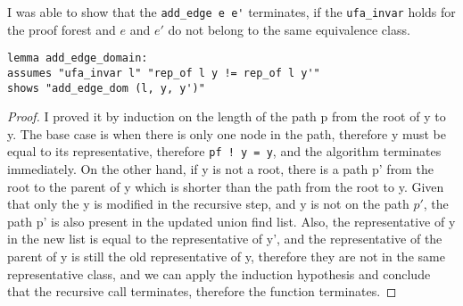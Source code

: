 I was able to show that the \lstinline{add_edge e e'} terminates, if the \lstinline{ufa_invar} holds for the proof forest and $e$ and $e'$ do not belong to the same equivalence class. 

\begin{lstlisting}
lemma add_edge_domain: 
assumes "ufa_invar l" "rep_of l y != rep_of l y'"
shows "add_edge_dom (l, y, y')"
\end{lstlisting}


\begin{proof}
I proved it by induction on the length of the path p from the root of y to y. 
The base case is when there is only one node in the path, therefore y must be equal to its representative, therefore \lstinline{pf ! y = y}, and the algorithm terminates immediately.
On the other hand, if y is not a root, there is a path p' from the root to the parent of y which is shorter than the path from the root to y. Given that only the y is modified in the recursive step, and y is not on the path $p'$, the path p' is also present in the updated union find list. Also, the representative of y in the new list is equal to the representative of y', and the representative of the parent of y is still the old representative of y, therefore they are not in the same representative class, and we can apply the induction hypothesis and conclude that the recursive call terminates, therefore the function terminates.
\end{proof}




